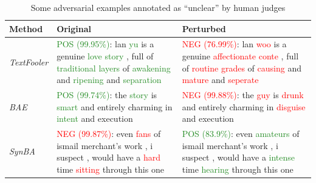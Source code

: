 \begin{table}[h]
    \footnotesize
    \centering
    \begin{tabularx}{\textwidth}{|l||X|X|}
    \hline
    \textbf{Method}   &   \textbf{Original}    &   \textbf{Perturbed}\\ \hline\hline
    \emph{TextFooler} & \textcolor{ForestGreen}{POS (99.95\%)}: lan \textcolor{ForestGreen}{yu} is a genuine \textcolor{ForestGreen}{love story} , full of \textcolor{ForestGreen}{traditional layers} of \textcolor{ForestGreen}{awakening} and \textcolor{ForestGreen}{ripening} and \textcolor{ForestGreen}{separation}  &  \textcolor{red}{NEG (76.99\%)}: lan \textcolor{red}{woo} is a genuine \textcolor{red}{affectionate conte} , full of \textcolor{red}{routine grades} of \textcolor{red}{causing} and \textcolor{red}{mature} and \textcolor{red}{seperate} \\ \hline
    \emph{BAE} &  \textcolor{ForestGreen}{POS (99.74\%)}: the \textcolor{ForestGreen}{story} is \textcolor{ForestGreen}{smart} and entirely charming in \textcolor{ForestGreen}{intent} and execution  & \textcolor{red}{NEG (99.88\%)}: the \textcolor{red}{guy} is \textcolor{red}{drunk} and entirely charming in \textcolor{red}{disguise} and execution \\ \hline
    \emph{SynBA} &  \textcolor{red}{NEG (99.87\%)}: even \textcolor{red}{fans} of ismail merchant's work , i suspect , would have a \textcolor{red}{hard} time \textcolor{red}{sitting} through this one &  \textcolor{ForestGreen}{POS (83.9\%)}: even \textcolor{ForestGreen}{amateurs} of ismail merchant's work , i suspect , would have a \textcolor{ForestGreen}{intense} time \textcolor{ForestGreen}{hearing} through this one \\
    \hline
\end{tabularx}
    \caption{Some adversarial examples annotated as “unclear” by human judges}
    \label{tab:unclear-examples}
\end{table}


